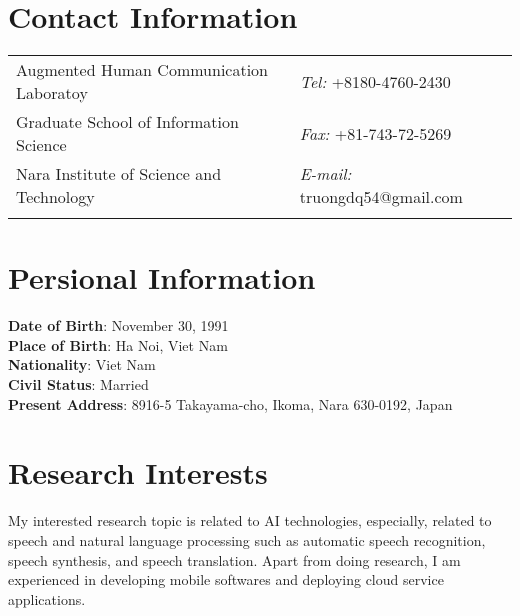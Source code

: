 \documentclass[margin,line]{res}
\begin{document}

\begin{resume}
\section{\sc Contact Information}
\vspace{.05in}
\begin{tabular}{@{}p{2in}p{4in}}
Augmented Human Communication Laboratoy            & {\it Tel:}  +8180-4760-2430 \\
Graduate School of Information Science   & {\it Fax:}    +81-743-72-5269 \\
Nara Institute of Science and Technology & {\it E-mail:}  truongdq54@gmail.com\\
  & 	%
\end{tabular}

\section{\sc Persional Information}
\textbf{Date of Birth}: 		November 30, 1991	\\
\textbf{Place of Birth}: 	Ha Noi, Viet Nam	\\
\textbf{Nationality}:		Viet Nam	\\
\textbf{Civil Status}:		Married	\\
\textbf{Present Address}:	8916-5 Takayama-cho, Ikoma, Nara 630-0192, Japan	\\

\section{\sc Research Interests}
My interested research topic is related to AI technologies, especially, related to speech and natural language processing such as automatic speech recognition, speech synthesis, and speech translation. Apart from doing research, I am experienced in developing mobile softwares and deploying cloud service applications.

\end{resume}
\end{document}
